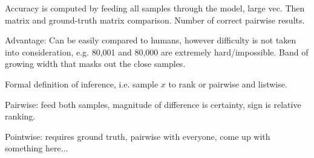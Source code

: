 Accuracy is computed by feeding all samples through the model, large vec. Then matrix and ground-truth matrix comparison. Number of correct pairwise results.

Advantage: Can be easily compared to humans, however difficulty is not taken into consideration, e.g. 80,001 and 80,000 are extremely hard/impossible. Band of growing width that masks out the close samples.

Formal definition of inference, i.e. sample $x$ to rank or pairwise and listwise. 

Pairwise: feed both samples, magnitude of difference is certainty, sign is relative ranking.

Pointwise: requires ground truth, pairwise with everyone, come up with something here...
